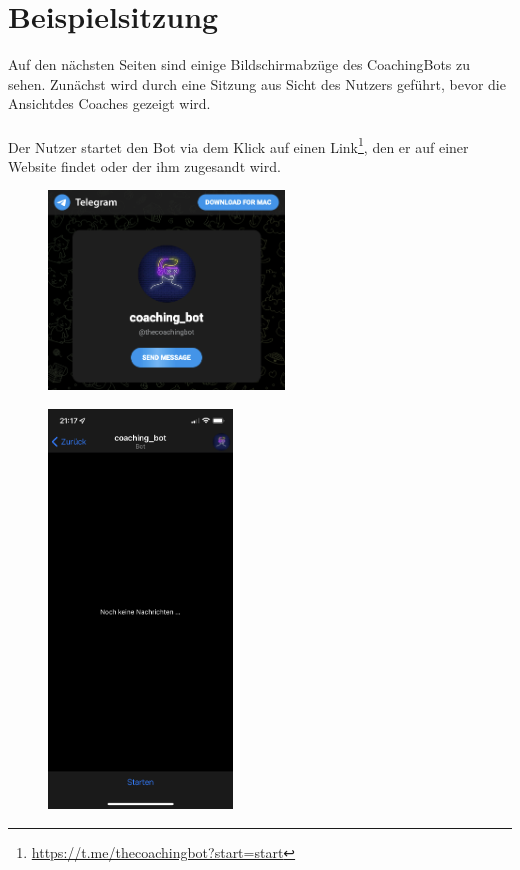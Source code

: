 \label{Beispiele}
\chapter{Beispielsitzung}

	Auf den nächsten Seiten sind einige Bildschirmabzüge des CoachingBots zu sehen. Zunächst wird durch eine Sitzung aus Sicht des Nutzers geführt, bevor die Ansichtdes Coaches gezeigt wird.\\ 
	\\
	Der Nutzer startet den Bot via dem Klick auf einen Link\footnote{\url{https://t.me/thecoachingbot?start=start}}, den er auf einer Website findet oder der ihm zugesandt wird.

	\begin{figure}
		\centering
		\begin{minipage}{.48\linewidth}
		  \centering
			{\includegraphics[width=\linewidth,height=150pt,keepaspectratio]{images/Screenshots/link.png}}
	  
			{\includegraphics[width=\linewidth,height=300pt,keepaspectratio]{images/Screenshots/start.PNG}}
	  

\end{minipage}
\end{figure}

